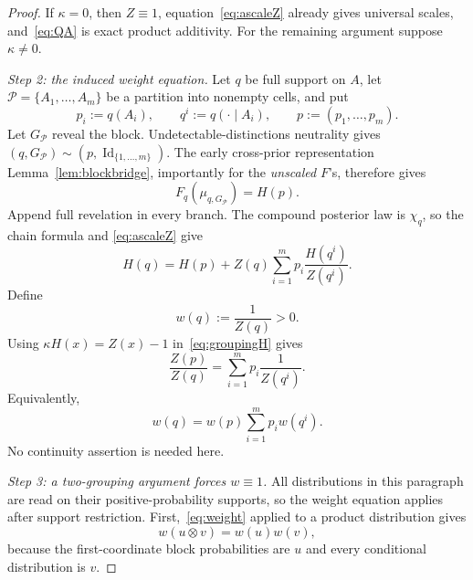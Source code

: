 \documentclass[11pt,a4paper]{article}
\theoremstyle{definition}
\newcommand{\Id}{\operatorname{Id}}
\newcommand{\1}{\mathbf 1}
\begin{document}
\begin{proof}
If $\kappa=0$, then $Z\equiv1$, equation~\eqref{eq:ascaleZ} already gives universal scales, and~\eqref{eq:QA} is exact
product additivity.  For the remaining argument suppose $\kappa\ne0$.

\emph{Step 2: the induced weight equation.}
Let $q$ be full support on $A$, let $\mathcal P=\{A_1,\ldots,A_m\}$ be a partition into nonempty cells, and put
\[
p_i:=q(A_i),
\qquad
q^i:=q(\cdot\mid A_i),
\qquad
p:=(p_1,\ldots,p_m).
\]
Let $G_{\mathcal P}$ reveal the block.  Undetectable-distinctions neutrality gives
$(q,G_{\mathcal P})\sim(p,\Id_{\{1,\ldots,m\}})$.  The early cross-prior representation
Lemma~\ref{lem:blockbridge}, importantly for the \emph{unscaled} $F$'s, therefore gives
\begin{equation}
F_q(\mu_{q,G_{\mathcal P}})=H(p).
\tag{BG}\label{eq:blockvalue}
\end{equation}
Append full revelation in every branch.  The compound posterior law is $\chi_q$, so the chain formula and
\eqref{eq:ascaleZ} give
\begin{equation}
H(q)=H(p)+Z(q)\sum_{i=1}^m p_i\frac{H(q^i)}{Z(q^i)}.
\tag{GR}\label{eq:groupingH}
\end{equation}
Define
\[
w(q):=\frac1{Z(q)}>0.
\]
Using $\kappa H(x)=Z(x)-1$ in~\eqref{eq:groupingH} gives
\[
\frac{Z(p)}{Z(q)}=\sum_{i=1}^m p_i\frac1{Z(q^i)}.
\]
Equivalently,
\begin{equation}
w(q)=w(p)\sum_{i=1}^m p_iw(q^i).
\tag{W}\label{eq:weight}
\end{equation}
No continuity assertion is needed here.

\emph{Step 3: a two-grouping argument forces $w\equiv1$.}
All distributions in this paragraph are read on their positive-probability supports, so the weight equation applies after
support restriction.  First,~\eqref{eq:weight} applied to a product distribution gives
\begin{equation}
w(u\otimes v)=w(u)w(v),
\tag{M}\label{eq:wmult}
\end{equation}
because the first-coordinate block probabilities are $u$ and every conditional distribution is $v$.


\end{proof}
\end{document}
